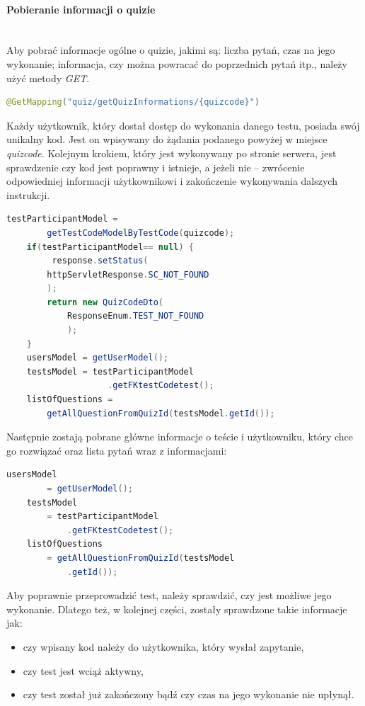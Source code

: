 \documentclass[twoside]{projektInzynierskiMS}
\numberwithin{figure}{section}
\begin{document}
\paragraph{Pobieranie informacji o quizie}
\mbox{} \\ \indent
Aby pobrać informacje ogólne o quizie, jakimi są: liczba pytań, czas na jego wykonanie; informacja, czy można powracać do poprzednich pytań itp., należy użyć metody \textit{GET}.
\begin{lstlisting}[language=Java,caption=Deklaracja metody żądania wraz z punktem końcowym. Źródło: Opracowanie własne.,captionpos=b]
@GetMapping("quiz/getQuizInformations/{quizcode}")
\end{lstlisting}
Każdy użytkownik, który dostał dostęp do wykonania danego testu, posiada swój unikalny kod. Jest on wpisywany do żądania podanego powyżej w miejsce \textit{quizcode}.
Kolejnym krokiem, który jest wykonywany po stronie serwera, jest sprawdzenie czy kod jest poprawny i istnieje, a jeżeli nie – zwrócenie odpowiedniej informacji użytkownikowi i zakończenie wykonywania dalszych instrukcji.
\newpage
\begin{lstlisting}[language=Java,caption=Sprawdzenie poprawności zapytania. Źródło: Opracowanie własne.,captionpos=b]
    testParticipantModel = 
        getTestCodeModelByTestCode(quizcode);
    if(testParticipantModel== null) {
         response.setStatus(
        httpServletResponse.SC_NOT_FOUND
        );
        return new QuizCodeDto(
            ResponseEnum.TEST_NOT_FOUND
            );
    }
    usersModel = getUserModel();
    testsModel = testParticipantModel
                    .getFKtestCodetest();
    listOfQuestions = 
        getAllQuestionFromQuizId(testsModel.getId());
\end{lstlisting}
Następnie zostają pobrane główne informacje o teście i użytkowniku, który chce go rozwiązać oraz lista pytań wraz z informacjami:
\begin{lstlisting}[language=Java,caption=Pobranie informacji z bazy danych. Źródło: Opracowanie własne.,captionpos=b]
    usersModel 
        = getUserModel();
    testsModel 
        = testParticipantModel
            .getFKtestCodetest();
    listOfQuestions 
        = getAllQuestionFromQuizId(testsModel
            .getId());
\end{lstlisting}
Aby poprawnie przeprowadzić test, należy sprawdzić, czy jest możliwe jego wykonanie. Dlatego też, w kolejnej części, zostały sprawdzone takie informacje jak:
\begin{itemize}
    \item czy wpisany kod należy do użytkownika, który wysłał zapytanie,
    \item czy test jest wciąż aktywny,
    \item czy test został już zakończony bądź czy czas na jego wykonanie nie upłynął.
\end{itemize}
\end{document}
